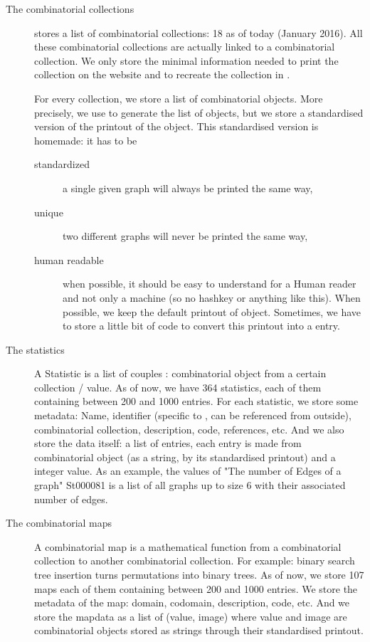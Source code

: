 \begin{description}
\item[The combinatorial collections] \FindStat stores a list of combinatorial collections: 18 as of today (January 2016). All these combinatorial collections are actually linked to a \SageMath combinatorial collection. We only store the minimal  information needed to print the collection on the website and to recreate the collection in \SageMath.

For every collection, we store a list of combinatorial objects. More precisely, we use \SageMath to generate the list of objects,
but we store a standardised version of the printout of the object. This standardised version is homemade: it has to be
\begin{description}
\item[standardized] a single given graph will always be printed the same way,
\item[unique] two different graphs will never be printed the same way,
\item[human readable] when possible, it should be easy to understand for a Human reader and not only a machine (so no hashkey or anything like this).
When possible, we keep the default printout of \SageMath object. Sometimes, we have to store a little bit of code to convert this printout into a
\SageMath entry.
\end{description}

\item[The statistics] A Statistic is a list of couples : combinatorial object from a certain collection / value. As of now, we have 364 statistics,
each of them containing between 200 and 1000 entries. For each statistic, we store some metadata: Name, identifier
(specific to \FindStat, can be referenced from outside), combinatorial collection, description, code, references, etc. And we also store the data itself: a list of entries,
each entry is made from combinatorial object (as a string, by its standardised printout) and a integer value. As an example, the values of "The number of Edges of a graph"
St000081 is a list of all graphs up to size 6 with their associated number of edges.

\item[The combinatorial maps] A combinatorial map is a mathematical function from a combinatorial collection to another combinatorial collection. For example: binary search
tree insertion turns permutations into binary trees. As of now, we store 107 maps each of them containing between 200 and 1000 entries. We store the metadata of the map: domain, codomain, description, code, etc. And we store the mapdata as a list of (value, image)
where value and image are combinatorial objects stored as strings through their standardised printout.
\end{description}

